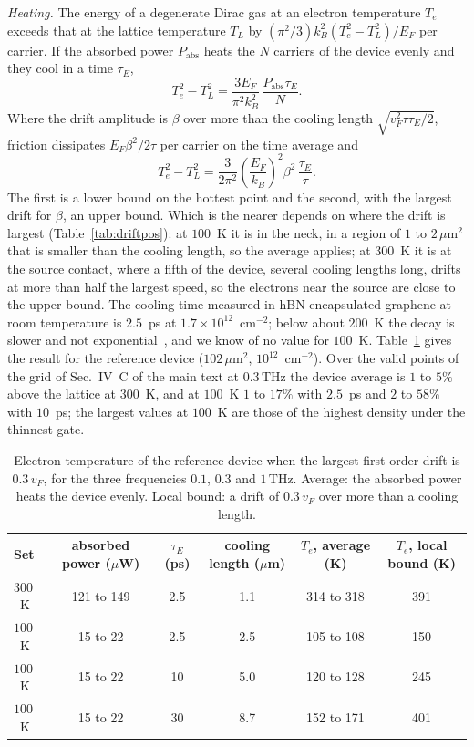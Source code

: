 \documentclass[aps,prapplied,onecolumn,superscriptaddress,floatfix]{revtex4-2}
\newcommand{\um}{\,\mu\mathrm{m}}
\newcommand{\THz}{\,\mathrm{THz}}
\begin{document}
\emph{Heating.} The energy of a degenerate Dirac gas at an electron
temperature $T_{e}$ exceeds that at the lattice temperature $T_{L}$ by
$(\pi^{2}/3)k_{B}^{2}(T_{e}^{2}-T_{L}^{2})/E_{F}$ per carrier. If the
absorbed power $P_{\mathrm{abs}}$ heats the $N$ carriers of the device
evenly and they cool in a time $\tau_{E}$,
\begin{equation}
T_{e}^{2}-T_{L}^{2}=\frac{3E_{F}}{\pi^{2}k_{B}^{2}}\,
\frac{P_{\mathrm{abs}}\tau_{E}}{N}.
\end{equation}
Where the drift amplitude is $\beta$ over more than the cooling length
$\sqrt{v_{F}^{2}\tau\tau_{E}/2}$, friction dissipates
$E_{F}\beta^{2}/2\tau$ per carrier on the time average and
\begin{equation}
T_{e}^{2}-T_{L}^{2}=\frac{3}{2\pi^{2}}\left(\frac{E_{F}}{k_{B}}\right)^{2}
\beta^{2}\,\frac{\tau_{E}}{\tau}.
\end{equation}
The first is a lower bound on the hottest point and the second, with the
largest drift for $\beta$, an upper bound. Which is the nearer depends on
where the drift is largest (Table~\ref{tab:driftpos}): at $100$~K it is
in the neck, in a region of $1$ to $2\um^{2}$ that is smaller than the
cooling length, so the average applies; at $300$~K it is at the source
contact, where a fifth of the device, several cooling lengths long,
drifts at more than half the largest speed, so the electrons near the
source are close to the upper bound. The cooling time measured in
hBN-encapsulated graphene at room temperature is $2.5$~ps at
$1.7\times10^{12}$~cm$^{-2}$; below about $200$~K the decay is slower and
not exponential~\cite{tielrooij2018out}, and we know of no value for
$100$~K. Table~\ref{tab:drift} gives the result for the reference device
($102\um^{2}$, $10^{12}$~cm$^{-2}$). Over the valid points of the grid of
Sec.~IV~C of the main text at $0.3\THz$ the device average is $1$ to
$5\%$ above the lattice at $300$~K, and at $100$~K $1$ to $17\%$ with
$2.5$~ps and $2$ to $58\%$ with $10$~ps; the largest values at $100$~K
are those of the highest density under the thinnest gate.

\begin{table}[ht]
\caption{\label{tab:drift}Electron temperature of the reference device
when the largest first-order drift is $0.3\,v_{F}$, for the three
frequencies $0.1$, $0.3$ and $1\THz$. Average: the absorbed power heats
the device evenly. Local bound: a drift of $0.3\,v_{F}$ over more than a
cooling length.}
\begin{ruledtabular}
\begin{tabular}{lccccc}
Set & absorbed power ($\mu$W) & $\tau_{E}$ (ps) & cooling length ($\mu$m) & $T_{e}$, average (K) & $T_{e}$, local bound (K) \\
\hline
$300$~K & 121 to 149 & 2.5 & 1.1 & 314 to 318 & 391 \\
$100$~K & 15 to 22 & 2.5 & 2.5 & 105 to 108 & 150 \\
$100$~K & 15 to 22 & 10 & 5.0 & 120 to 128 & 245 \\
$100$~K & 15 to 22 & 30 & 8.7 & 152 to 171 & 401 \\
\end{tabular}
\end{ruledtabular}
\end{table}
\end{document}
